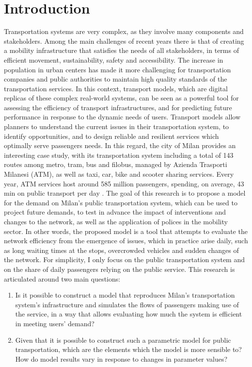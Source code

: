 \chapter{Introduction} \label{ch:intro}


Transportation systems are very complex, as they involve many components and stakeholders. Among the main challenges of recent years there is that of creating a mobility infrastructure that satisfies the needs of all stakeholders, in terms of efficient movement, sustainability, safety and accessibility. The increase in population in urban centers has made it more challenging for transportation companies and public authorities to maintain high quality standards of the transportation services. In this context, transport models, which are digital replicas of these complex real-world systems, can be seen as a powerful tool for assessing the efficiency of transport infrastructures, and for predicting future performance in response to the dynamic needs of users. Transport models allow planners to understand the current issues in their transportation system, to identify opportunities, and to design reliable and resilient services which optimally serve passengers needs. 
In this regard, the city of Milan provides an interesting case study, with its transportation system including a total of 143 routes among metro, tram, bus and filobus, managed by Azienda Trasporti Milanesi (ATM), as well as taxi, car, bike and scooter sharing services. Every year, ATM services host around 585 million passengers, spending, on average, 43 min on public transport per day \cite{bib2}. The goal of this research is to propose a model for the demand on Milan's public transportation system, which can be used to project future demands, to test in advance the impact of interventions and changes to the network, as well as the application of polices in the mobility sector. In other words, the proposed model is a tool that attempts to evaluate the network efficiency from the emergence of issues, which in practice arise daily, such as long waiting times at the stops, overcrowded vehicles and sudden changes of the network. For simplicity, I only focus on the public transportation system and on the share of daily passengers relying on the public service.
This research is articulated around two main questions:
\begin{enumerate}
    \item Is it possible to construct a model that reproduces Milan's transportation system's infrastructure and simulates the flows of passengers making use of the service, in a way that allows evaluating how much the system is efficient in meeting users' demand?
    \item Given that it is possible to construct such a parametric model for public transportation, which are the elements which the model is more sensible to? How do model results vary in response to changes in parameter values?  
\end{enumerate}
